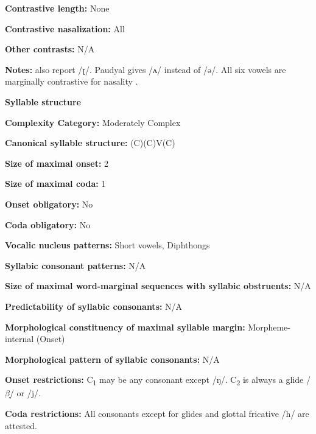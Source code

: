 \textbf{Contrastive length:} None



\textbf{Contrastive nasalization:} All



\textbf{Other contrasts:} N/A



\textbf{Notes:} \citealt{KotapishKotapish1973} also report /ɽ/. Paudyal gives /ʌ/ instead of /ə/. All six vowels are marginally contrastive for nasality \citep[7]{Dhakal2012}.



\textbf{Syllable structure}



\textbf{Complexity Category:} Moderately Complex



\textbf{Canonical syllable structure:} (C)(C)V(C) \citep[17-20]{Dhakal2012}



\textbf{Size of maximal onset:} 2



\textbf{Size of maximal coda:} 1



\textbf{Onset obligatory:} No



\textbf{Coda obligatory:} No



\textbf{Vocalic nucleus patterns:} Short vowels, Diphthongs



\textbf{Syllabic consonant patterns:} N/A



\textbf{Size of maximal word{}-marginal sequences with syllabic obstruents:} N/A



\textbf{Predictability of syllabic consonants:} N/A



\textbf{Morphological constituency of maximal syllable margin:} Morpheme-internal (Onset)



\textbf{Morphological pattern of syllabic consonants:} N/A



\textbf{Onset restrictions:} C\textsubscript{1} may be any consonant except /ŋ/. C\textsubscript{2} is always a glide /$\beta ̞$/ or /j/.



\textbf{Coda restrictions:} All consonants except for glides and glottal fricative /h/ are attested.



